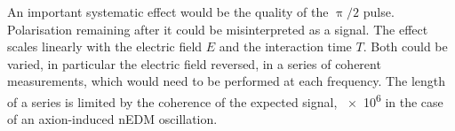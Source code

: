 An important systematic effect would be the quality of the $\uppi/2$ pulse. Polarisation remaining after it could be misinterpreted as a signal. The effect scales linearly with the electric field $E$ and the interaction time $T$. Both could be varied, in particular the electric field reversed, in a series of coherent measurements, which would need to be performed at each frequency. The length of a series is limited by the coherence of the expected signal, \num{e6} in the case of an axion-induced nEDM oscillation.
